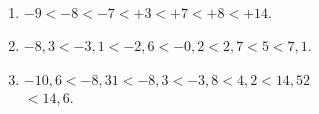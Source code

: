     \ \\ [-7mm]
    {\baselineskip=7mm
    \begin{enumerate}
       \item \red $-9<-8<-7<+3<+7<+8<+14$.
       \item \red $-8,3<-3,1<-2,6<-0,2<2,7<5<7,1$.
       \item \red$-10,6<-8,31<-8,3<-3,8<4,2<14,52$ \\
       \hfill $<14,6$.
    \end{enumerate}}

